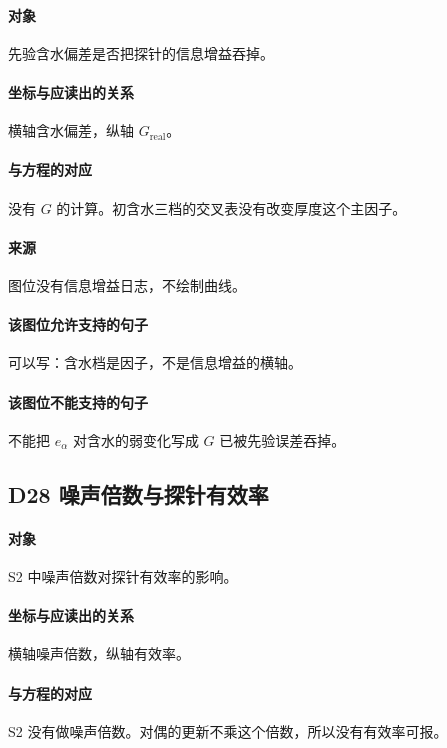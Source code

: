 \paragraph{对象}
先验含水偏差是否把探针的信息增益吞掉。

\paragraph{坐标与应读出的关系}
横轴含水偏差，纵轴 $G_{\mathrm{real}}$。

\paragraph{与方程的对应}
没有 $G$ 的计算。初含水三档的交叉表没有改变厚度这个主因子。

\paragraph{来源}
图位没有信息增益日志，不绘制曲线。

\paragraph{该图位允许支持的句子}
可以写：含水档是因子，不是信息增益的横轴。

\paragraph{该图位不能支持的句子}
不能把 $e_\alpha$ 对含水的弱变化写成 $G$ 已被先验误差吞掉。

\subsection{D28 噪声倍数与探针有效率}
\paragraph{对象}
S2 中噪声倍数对探针有效率的影响。

\paragraph{坐标与应读出的关系}
横轴噪声倍数，纵轴有效率。

\paragraph{与方程的对应}
S2 没有做噪声倍数。对偶的更新不乘这个倍数，所以没有有效率可报。

